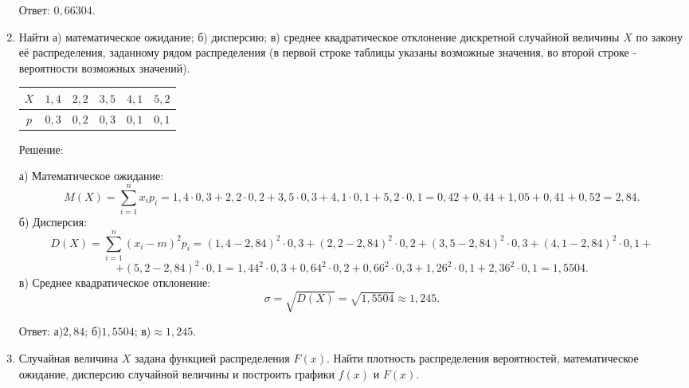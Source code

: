 \documentclass{article}
\begin{document}
\begin{enumerate}
Ответ: $0,66304$.

\item %
Найти а) математическое ожидание; б) дисперсию; в) среднее квадратическое отклонение дискретной случайной величины $X$ по закону её распределения, заданному рядом распределения (в первой строке таблицы указаны возможные значения, во второй строке - вероятности возможных значений).

\begin{center}
\begin{tabular}{|c|c|c|c|c|c|}
\hline
$X$ & $1,4$ & $2,2$ & $3,5$ & $4,1$ & $5,2$ \\
\hline
$p$ & $0,3$ & $0,2$ & $0,3$ & $0,1$ & $0,1$ \\
\hline
\end{tabular}
\end{center}
\begin{center}Решение:\end{center}
а) Математическое ожидание: $$M(X)=\sum_{i=1}^n x_i p_i=1,4\cdot0,3+2,2\cdot0,2+3,5\cdot0,3+4,1\cdot0,1+5,2\cdot0,1=0,42+0,44+1,05+0,41+0,52=2,84.$$
б) Дисперсия:
$$D(X)=\sum_{i=1}^n (x_i-m)^2 p_i=(1,4-2,84)^2\cdot0,3+(2,2-2,84)^2\cdot0,2+(3,5-2,84)^2\cdot0,3+(4,1-2,84)^2\cdot0,1+$$
$$+(5,2-2,84)^2\cdot0,1=1,44^2\cdot0,3+0,64^2\cdot0,2+0,66^2\cdot0,3+1,26^2\cdot0,1+2,36^2\cdot0,1=1,5504.$$
в) Среднее квадратическое отклонение:
$$\sigma=\sqrt{D(X)}=\sqrt{1,5504}\approx1,245.$$

Ответ: а)$2,84$; б)$1,5504$; в)$\approx1,245$.

\item %
Случайная величина $X$ задана функцией распределения $F(x)$. Найти плотность распределения вероятностей, математическое ожидание, дисперсию случайной величины и построить графики $f(x)$ и $F(x)$.


\end{enumerate}
\end{document}
